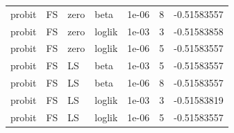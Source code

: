 \begin{table}[htbp]
\begin{tabular}{llllrrr}
probit & FS & zero & beta & 1e-06 &  8 & -0.51583557 \\
probit & FS & zero & loglik & 1e-03 &  3 & -0.51583858 \\
probit & FS & zero & loglik & 1e-06 &  5 & -0.51583557 \\
probit & FS & LS & beta & 1e-03 &  5 & -0.51583557 \\
probit & FS & LS & beta & 1e-06 &  8 & -0.51583557 \\
probit & FS & LS & loglik & 1e-03 &  3 & -0.51583819 \\
probit & FS & LS & loglik & 1e-06 &  5 & -0.51583557 \\
\bottomrule
\end{tabular}
\end{table}
